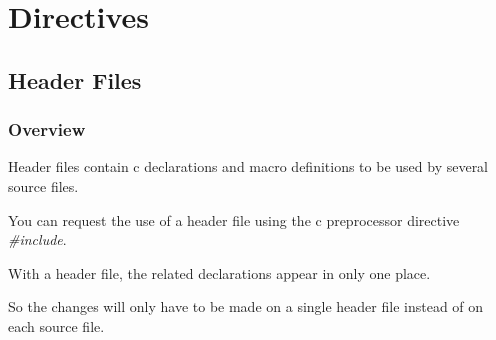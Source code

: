 \documentclass[9pt]{beamer}
\newcommand{\nl}[0]{\vspace{0.4cm}}
\begin{document}
%
%

\section{Directives}

%
%

\subsection{Header Files}


\begin{frame}
  \frametitle{Overview}

  Header files contain c declarations and macro definitions to be used
  by several source files.

  \nl

  You can request the use of a header file using the c preprocessor
  directive \textit{\#include}.

  \nl

  With a header file, the related declarations appear in only one place.

  \nl

  So the changes will only have to be made on a single header file
  instead of on each source file.
\end{frame}


\end{document}
